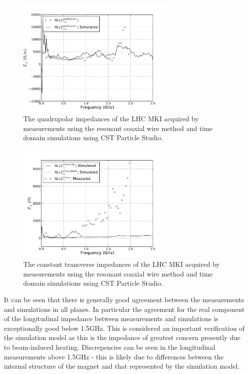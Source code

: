 \begin{figure}
\begin{center}
\includegraphics[width=0.7\textwidth]{LHC_MKI/figures/mki_15_sims_meas_quad_horz.pdf}
\end{center}
\label{fig:mki-15-quadrupolar}
\caption{The quadrupolar impedances of the LHC MKI acquired by measurements using the resonant coaxial wire method and time domain simulations using CST Particle Studio.}
\end{figure}

\begin{figure}
\begin{center}
\includegraphics[width=0.7\textwidth]{LHC_MKI/figures/mki_15_sims_meas_const.pdf}
\end{center}
\label{fig:mki-15-constant}
\caption{The constant transverse impedances of the LHC MKI acquired by measurements using the resonant coaxial wire method and time domain simulations using CST Particle Studio.}
\end{figure}


It can be seen that there is generally good agreement between the measurements and simulations in all planes. In particular the agreement for the real component of the longitudinal impedance between measurements and simulations is exceptionally good below 1.5GHz. This is considered an important verification of the simulation model as this is the impedance of greatest concern presently due to beam-induced heating. Discrepencies can be seen in the longitudinal measurements above 1.5GHz - this is likely due to differences between the internal structure of the magnet and that represented by the simulation model.

